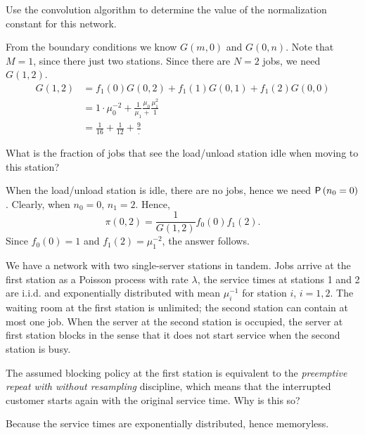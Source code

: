 \begin{exercise}[201704]
  Use the convolution algorithm to determine the value of the
  normalization constant for this network.
\begin{solution}
    From the boundary conditions we know $G(m, 0)$ and $G(0,n)$. Note
    that $M=1$, since there just two stations. Since there are $N=2$
    jobs, we need $G(1,2)$. 
    \begin{equation*}
      \begin{split}
      G(1,2) &= f_1(0) G(0, 2) + f_1(1) G(0, 1) + f_1(2) G(0,0) \\
       &= 1\cdot \mu_0^{-2}  + \frac1{\mu_1} \frac{\mu_0}  + \frac{\mu_1^2} 1 \\
       &= \frac 1{16} + \frac1{12}  + \frac{9}.
      \end{split}
    \end{equation*}
\end{solution}
\end{exercise}

\begin{exercise}[201704]
  What is the fraction of jobs that see the load/unload station idle
  when moving to this station?
\begin{solution}
    When the load/unload station is idle, there are no jobs, hence we need
      $\P{n_0=0}$. Clearly, when $n_0=0$, $n_1 = 2$. Hence,
    \begin{equation*}
\pi(0, 2) = \frac1{G(1,2)} f_0(0) f_1(2).
    \end{equation*}
Since $f_0(0) = 1$ and $f_1(2) = \mu_1^{-2}$, the answer follows.
\end{solution}
\end{exercise}

We have a network with two single-server stations in tandem. Jobs
arrive at the first station as a Poisson process with rate $\lambda$,
the service times at stations 1 and 2 are i.i.d. and exponentially
distributed with  mean $\mu_i^{-1}$ for station $i$, $i=1,2$. The waiting room at the first station is unlimited; the  second station can contain at most one job. When the server at the second station is occupied, the server at first station blocks in the sense that it does not start service when  the second station is busy. 

\begin{exercise}[201706]
  The assumed blocking  policy at the first station is equivalent to the \emph{preemptive repeat with without resampling} discipline, which means that the interrupted customer starts again with the original service time. Why is this so? 
\begin{solution}
  Because the service times are exponentially distributed, hence memoryless. 
\end{solution}
\end{exercise}

